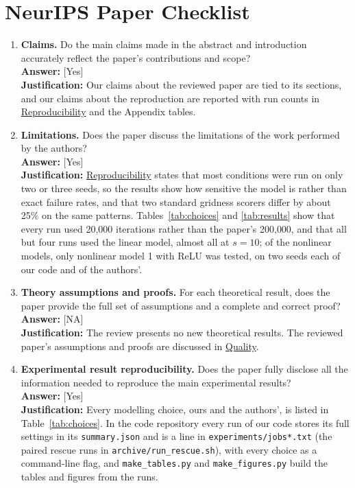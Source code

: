 \documentclass[10pt,letterpaper]{article}
\begin{document}
\section*{NeurIPS Paper Checklist}
\small
\begin{enumerate}
 
\item \textbf{Claims.} Do the main claims made in the abstract and introduction accurately reflect the paper's contributions and scope?\\
\textbf{Answer:} [Yes]\\
\textbf{Justification:} Our claims about the reviewed paper are tied to its sections, and our claims about the reproduction are reported with run counts in \hyperref[sec:repro]{Reproducibility} and the Appendix tables.
 
\item \textbf{Limitations.} Does the paper discuss the limitations of the work performed by the authors?\\
\textbf{Answer:} [Yes]\\
\textbf{Justification:} \hyperref[sec:repro]{Reproducibility} states that most conditions were run on only two or three seeds, so the results show how sensitive the model is rather than exact failure rates, and that two standard gridness scorers differ by about 25\% on the same patterns. Tables~\ref{tab:choices} and \ref{tab:results} show that every run used 20{,}000 iterations rather than the paper's 200{,}000, and that all but four runs used the linear model, almost all at $s=10$; of the nonlinear models, only nonlinear model 1 with ReLU was tested, on two seeds each of our code and of the authors'.
 
\item \textbf{Theory assumptions and proofs.} For each theoretical result, does the paper provide the full set of assumptions and a complete and correct proof?\\
\textbf{Answer:} [NA]\\
\textbf{Justification:} The review presents no new theoretical results. The reviewed paper's assumptions and proofs are discussed in \hyperref[sec:quality]{Quality}.
 
\item \textbf{Experimental result reproducibility.} Does the paper fully disclose all the information needed to reproduce the main experimental results?\\
\textbf{Answer:} [Yes]\\
\textbf{Justification:} Every modelling choice, ours and the authors', is listed in Table~\ref{tab:choices}. In the code repository every run of our code stores its full settings in its \texttt{summary.json} and is a line in \texttt{experiments/jobs*.txt} (the paired rescue runs in \texttt{archive/run\_rescue.sh}), with every choice as a command-line flag, and \texttt{make\_tables.py} and \texttt{make\_figures.py} build the tables and figures from the runs.
 

\end{enumerate}
\end{document}
